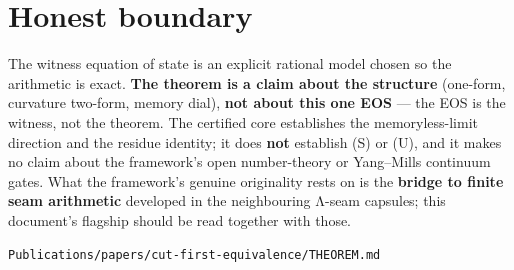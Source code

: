 \hypertarget{honest-boundary}{%
\section{Honest boundary}\label{honest-boundary}}

The witness equation of state is an explicit rational model chosen so the
arithmetic is exact. \textbf{The theorem is a claim about the structure}
(one-form, curvature two-form, memory dial), \textbf{not about this one EOS} ---
the EOS is the witness, not the theorem. The certified core establishes
the memoryless-limit direction and the residue identity; it does \textbf{not}
establish (S) or (U), and it makes no claim about the framework's open
number-theory or Yang--Mills continuum gates. What the framework's genuine
originality rests on is the \textbf{bridge to finite seam arithmetic} developed
in the neighbouring Λ-seam capsules; this document's flagship should be
read together with those.

\begin{flushright}\small\texttt{Publications/papers/cut-first-equivalence/THEOREM.md}\end{flushright}
